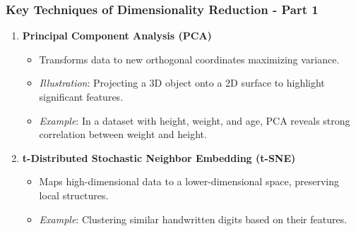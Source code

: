 \documentclass[aspectratio=169]{beamer}
\begin{document}
\begin{frame}[fragile]
    \frametitle{Key Techniques of Dimensionality Reduction - Part 1}
    \begin{enumerate}
        \item \textbf{Principal Component Analysis (PCA)}
            \begin{itemize}
                \item Transforms data to new orthogonal coordinates maximizing variance.
                \item \textit{Illustration}: Projecting a 3D object onto a 2D surface to highlight significant features.
                \item \textit{Example}: In a dataset with height, weight, and age, PCA reveals strong correlation between weight and height.
            \end{itemize}
        \item \textbf{t-Distributed Stochastic Neighbor Embedding (t-SNE)}
            \begin{itemize}
                \item Maps high-dimensional data to a lower-dimensional space, preserving local structures.
                \item \textit{Example}: Clustering similar handwritten digits based on their features.
            \end{itemize}
    \end{enumerate}
\end{frame}
\end{document}
